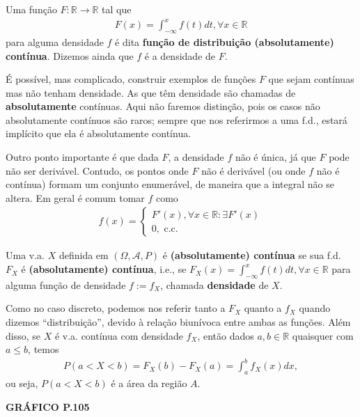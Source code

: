 \documentclass[../Notas.tex]{subfiles}
\begin{document}
\begin{definition}
Uma função $F:\mathbb{R}\to\mathbb{R}$ tal que
\begin{align*}
    F(x) = \int_{-\infty}^x f(t) dt, \forall x\in\mathbb{R}
\end{align*}
para alguma densidade $f$ é dita \textbf{função de distribuição (absolutamente) contínua}. Dizemos ainda que $f$ é a densidade de $F$.
\end{definition}

\begin{remark}
É possível, mas complicado, construir exemplos de funções $F$ que sejam contínuas mas não tenham densidade. As que têm densidade são chamadas de \textbf{absolutamente} contínuas. Aqui não faremos distinção, pois os casos não absolutamente contínuos são raros; sempre que nos referirmos a uma f.d., estará implícito que ela é absolutamente contínua.

Outro ponto importante é que dada $F$, a densidade $f$ não é única, já que $F$ pode não ser derivável. Contudo, os pontos onde $F$ não é derivável (ou onde $f$ não é contínua) formam um conjunto enumerável, de maneira que a integral não se altera. Em geral é comum tomar $f$ como
\begin{align*}
    f(x) = \begin{cases}
    F'(x), \forall x\in\mathbb{R} : \exists F'(x) \\
    0, \text{ c.c.}
    \end{cases}
\end{align*}
\end{remark}

\begin{definition}
Uma v.a. $X$ definida em $(\Omega, \mathcal{A}, P)$ é \textbf{(absolutamente) contínua} se sua f.d. $F_X$ é \textbf{(absolutamente) contínua}, i.e., se $F_X(x) = \displaystyle{ \int_{-\infty}^x f(t)dt, \forall x\in\mathbb{R} }$ para alguma função de densidade $f:=f_X$, chamada \textbf{densidade} de $X$.
\end{definition}

\begin{remark}
Como no caso discreto, podemos nos referir tanto a $F_X$ quanto a $f_X$ quando dizemos ``distribuição'', devido à relação biunívoca entre ambas as funções. Além disso, se $X$ é v.a. contínua com densidade $f_X$, então dados $a,b\in\mathbb{R}$ quaisquer com $a\leq b$, temos
\begin{align*}
    P(a < X < b) = F_X(b) - F_X(a) = \int_a^b f_X(x) dx,
\end{align*}
ou seja, $P(a < X < b)$ é a área da região $A$.
\begin{center}
    \textbf{GRÁFICO P.105}
\end{center}
\end{remark}
\end{document}
